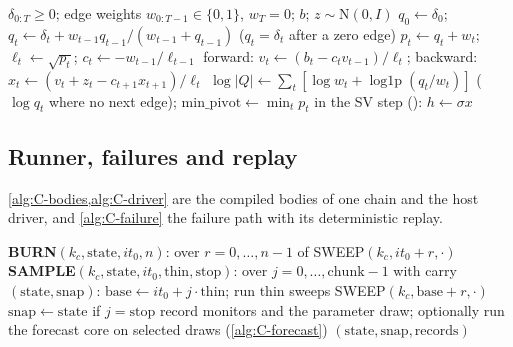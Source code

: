 \begin{algorithm}[!htbp]
\caption{Random-walk SV path as a path Laplacian ():
$Q = \mathrm{Lap}_w + \operatorname{diag}(\delta)$, $Q_{tt} = \delta_t + w_{t-1} + w_t$, $Q_{t,t-1} =
-w_{t-1}$ (\cref{app:pivots}).}
\label{alg:C-laplacian}
\footnotesize
\begin{algorithmic}[1]
\Require $\delta_{0:T} \ge 0$; edge weights $w_{0:T-1} \in \{0, 1\}$, $w_T = 0$; $b$; $z \sim \mathrm{N}(0, I)$
\State $q_0 \gets \delta_0$; $q_t \gets \delta_t + w_{t-1}q_{t-1}/(w_{t-1} + q_{t-1})$ ($q_t = \delta_t$ after a zero edge) 
\State $p_t \gets q_t + w_t$; $\ell_t \gets \sqrt{p_t}$; $c_t \gets -w_{t-1}/\ell_{t-1}$ 
\State forward: $v_t \gets (b_t - c_tv_{t-1})/\ell_t$; backward: $x_t \gets (v_t + z_t - c_{t+1}x_{t+1})/\ell_t$
\State $\log|Q| \gets \sum_t[\log w_t + \operatorname{log1p}(q_t/w_t)]$ ($\log q_t$ where no next edge); $\mathrm{min\_pivot} \gets \min_t p_t$
\State in the SV step (): $h \gets \sigma x$ 
\end{algorithmic}
\end{algorithm}

\subsection{Runner, failures and replay}\label{app:alg-runner}

\cref{alg:C-bodies,alg:C-driver} are the compiled bodies of one chain and the host driver, and
\cref{alg:C-failure} the failure path with its deterministic replay.

\begin{algorithm}[!htbp]
\caption{Burn-in and sampling bodies of one chain (, ).
Counters are uint32 throughout (erratum E7).}
\label{alg:C-bodies}
\footnotesize
\begin{algorithmic}[1]
\Statex \textbf{BURN}$(k_c, \mathrm{state}, it_0, n)$:
\State \Return {} over $r = 0, \dots, n - 1$ of SWEEP$(k_c, it_0 + r, \cdot)$ 
\Statex \textbf{SAMPLE}$(k_c, \mathrm{state}, it_0, \mathrm{thin}, \mathrm{stop})$:
\State {} over $j = 0, \dots, \mathrm{chunk} - 1$ with carry $(\mathrm{state}, \mathrm{snap})$:
\State \quad $\mathrm{base} \gets it_0 + j\cdot\mathrm{thin}$; run $\mathrm{thin}$ sweeps SWEEP$(k_c, \mathrm{base} + r, \cdot)$
\State \quad $\mathrm{snap} \gets \mathrm{state}$ if $j = \mathrm{stop}$ 
\State \quad record monitors and the parameter draw; optionally run the forecast core on selected draws (\cref{alg:C-forecast})
\State \Return $(\mathrm{state}, \mathrm{snap}, \mathrm{records})$
\end{algorithmic}
\end{algorithm}


